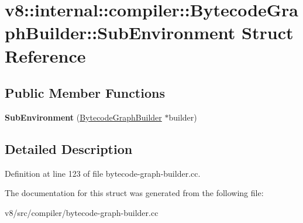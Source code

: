 \hypertarget{structv8_1_1internal_1_1compiler_1_1BytecodeGraphBuilder_1_1SubEnvironment}{}\section{v8\+:\+:internal\+:\+:compiler\+:\+:Bytecode\+Graph\+Builder\+:\+:Sub\+Environment Struct Reference}
\label{structv8_1_1internal_1_1compiler_1_1BytecodeGraphBuilder_1_1SubEnvironment}
\subsection*{Public Member Functions}
\begin{DoxyCompactItemize}
\item 
\mbox{\label{structv8_1_1internal_1_1compiler_1_1BytecodeGraphBuilder_1_1SubEnvironment_a3ccf306a70873cd9aef865e0c770ec78}} 
{\bfseries Sub\+Environment} (\mbox{\hyperlink{classv8_1_1internal_1_1compiler_1_1BytecodeGraphBuilder}{Bytecode\+Graph\+Builder}} $\ast$builder)
\end{DoxyCompactItemize}


\subsection{Detailed Description}


Definition at line 123 of file bytecode-\/graph-\/builder.\+cc.



The documentation for this struct was generated from the following file\+:\begin{DoxyCompactItemize}
\item 
v8/src/compiler/bytecode-\/graph-\/builder.\+cc\end{DoxyCompactItemize}
